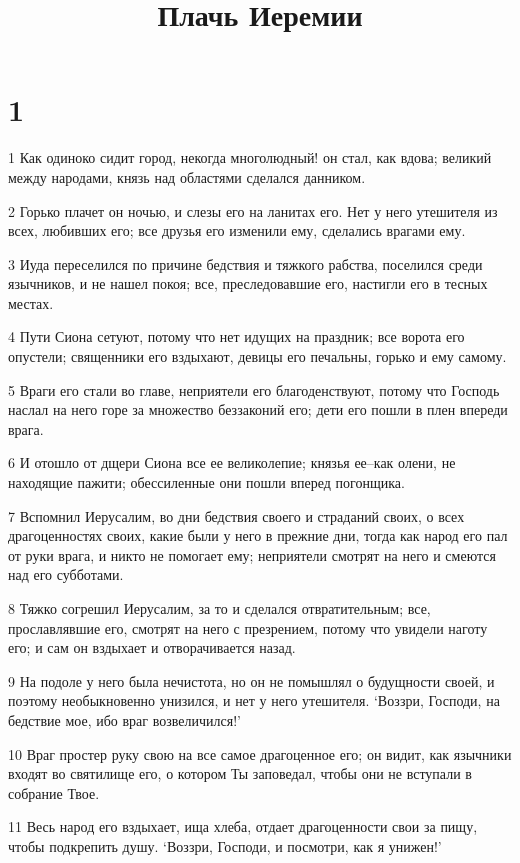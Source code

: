

\title{Плачь Иеремии}


\chapter{1}

\par 1 Как одиноко сидит город, некогда многолюдный! он стал, как вдова; великий между народами, князь над областями сделался данником.
\par 2 Горько плачет он ночью, и слезы его на ланитах его. Нет у него утешителя из всех, любивших его; все друзья его изменили ему, сделались врагами ему.
\par 3 Иуда переселился по причине бедствия и тяжкого рабства, поселился среди язычников, и не нашел покоя; все, преследовавшие его, настигли его в тесных местах.
\par 4 Пути Сиона сетуют, потому что нет идущих на праздник; все ворота его опустели; священники его вздыхают, девицы его печальны, горько и ему самому.
\par 5 Враги его стали во главе, неприятели его благоденствуют, потому что Господь наслал на него горе за множество беззаконий его; дети его пошли в плен впереди врага.
\par 6 И отошло от дщери Сиона все ее великолепие; князья ее--как олени, не находящие пажити; обессиленные они пошли вперед погонщика.
\par 7 Вспомнил Иерусалим, во дни бедствия своего и страданий своих, о всех драгоценностях своих, какие были у него в прежние дни, тогда как народ его пал от руки врага, и никто не помогает ему; неприятели смотрят на него и смеются над его субботами.
\par 8 Тяжко согрешил Иерусалим, за то и сделался отвратительным; все, прославлявшие его, смотрят на него с презрением, потому что увидели наготу его; и сам он вздыхает и отворачивается назад.
\par 9 На подоле у него была нечистота, но он не помышлял о будущности своей, и поэтому необыкновенно унизился, и нет у него утешителя. `Воззри, Господи, на бедствие мое, ибо враг возвеличился!'
\par 10 Враг простер руку свою на все самое драгоценное его; он видит, как язычники входят во святилище его, о котором Ты заповедал, чтобы они не вступали в собрание Твое.
\par 11 Весь народ его вздыхает, ища хлеба, отдает драгоценности свои за пищу, чтобы подкрепить душу. `Воззри, Господи, и посмотри, как я унижен!'
